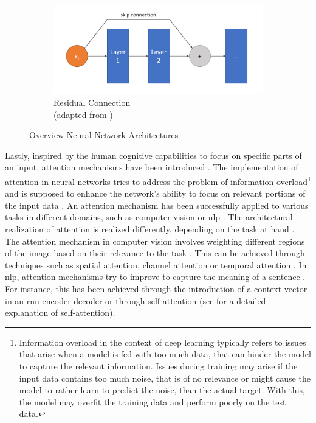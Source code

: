 \begin{figure}[H]
  \begin{subfigure}{0.6\textwidth}
    \centering
    \includegraphics[width=\linewidth]{images/resnet.png}
    \captionsetup{justification=centering}
    \caption{Residual Connection \\(adapted from \cite{hassan2019ResNet3450})} \label{fig:resnet}
  \end{subfigure}
\caption[Overview Neural Network Architectures]{Overview Neural Network Architectures} \label{fig:NN_architectures_Overview}
\end{figure}

\newpage
Lastly, inspired by the human cognitive capabilities to focus on specific parts of an input, attention mechanisms have been introduced \cite{niu2021ReviewAttentionMechanism, aggarwal2018NeuralNetworksDeep}.
The implementation of attention in neural networks tries to address the problem of information overload\footnote{Information overload in the context of deep learning typically refers to issues that arise when a \gls{model} is fed with too much data, that can hinder the \gls{model} to capture the relevant information.
Issues during training may arise if the input data contains too much noise, that is of no relevance or might cause the \gls{model} to rather learn to predict the noise, than the actual target.
With this, the \gls{model} may overfit the training data and perform poorly on the test data.} and is supposed to enhance the network's ability to focus on relevant portions of the input data \cite{niu2021ReviewAttentionMechanism}.
An attention mechanism has been successfully applied to various tasks in different domains, such as computer vision or \gls{nlp} \cite{niu2021ReviewAttentionMechanism}.
The architectural realization of attention is realized differently, depending on the task at hand \cite{aggarwal2018NeuralNetworksDeep}.
The attention mechanism in computer vision involves weighting different regions of the image based on their relevance to the task \cite{aggarwal2018NeuralNetworksDeep}. 
This can be achieved through techniques such as spatial attention, channel attention or temporal attention \cite{guo2022AttentionMechanismsComputer}.
In \gls{nlp}, attention mechanisms try to improve to capture the meaning of a sentence \cite{niu2021ReviewAttentionMechanism}. 
For instance, this has been achieved through the introduction of a context vector in an \gls{rnn} encoder-decoder \cite{DBLP:journals/corr/BahdanauCB14} or through self-attention \cite{vaswani2017AttentionAllYou} (see  for a detailed explanation of self-attention).

